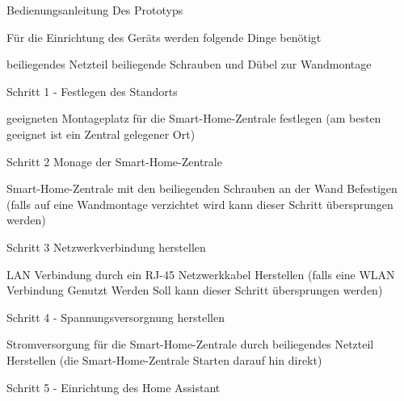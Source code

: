 Bedienungsanleitung Des Prototyps

Für die Einrichtung des Geräts werden folgende Dinge benötigt

beiliegendes Netzteil
beiliegende Schrauben und Dübel zur Wandmontage


Schritt 1 - Festlegen des Standorts

geeigneten Montageplatz für die Smart-Home-Zentrale festlegen
    (am besten geeignet ist ein Zentral gelegener Ort)
    
Schritt 2 Monage der Smart-Home-Zentrale

Smart-Home-Zentrale mit den beiliegenden Schrauben an der Wand Befestigen
    (falls auf eine Wandmontage verzichtet wird kann dieser Schritt übersprungen werden)
    
Schritt 3 Netzwerkverbindung herstellen

LAN Verbindung durch ein RJ-45 Netzwerkkabel Herstellen
    (falls eine WLAN Verbindung Genutzt Werden Soll kann dieser Schritt übersprungen werden)
    
Schritt 4 - Spannungsversorgnung herstellen

Stromversorgung für die Smart-Home-Zentrale durch beiliegendes Netzteil Herstellen
    (die Smart-Home-Zentrale Starten darauf hin direkt)
    
Schritt 5 - Einrichtung des Home Assistant

